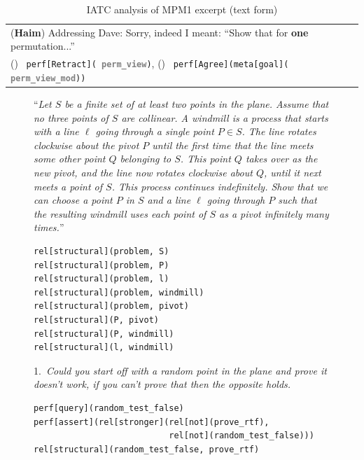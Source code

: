 \documentclass[smallextended,oneside]{svjour3}       %
\newcounter{turn}
\newcommand{\newturn}{\refstepcounter{turn}(\textbf{\theturn})~\label{ex:\theturn}}
\begin{document}
{\begin{table}[t]
{\begin{tabular}{!{\vrule width 1pt} p{.95\textwidth} !{\vrule width 1pt}}
(\textbf{Haim}) Addressing Dave:
Sorry, indeed I meant: ``Show that for {\bf one}
permutation...'' \\
\vspace{-.5\baselineskip}
\newturn
\texttt{perf[\textcolor{perform}{Retract}](%
                                \textbf{\textcolor{gray}{perm\_view}})}, \newline
\newturn
\texttt{perf[\textcolor{perform}{Agree}](meta[\textcolor{meta}{goal}](%
                                \textbf{\textcolor{gray}{perm\_view\_mod}}))}\\ \toprule
\end{tabular}

\par}

\caption{IATC analysis of MPM1 excerpt (text form)\label{tab:running-example-analysed}}
\end{table}

\FloatBarrier

\begin{figure}
\begin{mdframed}
``\emph{Let $S$ be a finite set of at least two points in the plane. Assume that no three points of $S$ are collinear. A windmill is a process that starts with a line $\ell$ going through a single point $P \in S$. The line rotates clockwise about the pivot $P$ until the first time that the line meets some other point $Q$ belonging to $S$. This point $Q$ takes over as the new pivot, and the line now rotates clockwise about $Q$, until it next meets a point of $S$. This process continues indefinitely. Show that we can choose a point $P$ in $S$ and a line $\ell$ going through $P$ such that the resulting windmill uses each point of $S$ as a pivot infinitely many times.}''

\begin{Verbatim}[commandchars=\\\{\}]
rel[structural](problem, S)
rel[structural](problem, P)
rel[structural](problem, l)
rel[structural](problem, windmill)
rel[structural](problem, pivot)
rel[structural](P, pivot)
rel[structural](P, windmill)
rel[structural](l, windmill)
\end{Verbatim}

1.~\emph{Could you start off with a random point in the plane and prove it doesn't work, if you can't prove that then the opposite holds.}

\begin{Verbatim}[commandchars=\\\{\}]
perf[query](random_test_false)
perf[assert](rel[stronger](rel[not](prove_rtf),
                           rel[not](random_test_false)))
rel[structural](random_test_false, prove_rtf)
\end{Verbatim}


\end{mdframed}
\end{figure}}
\end{document}
